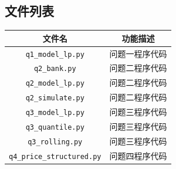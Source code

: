 \begin{appendices}



\section{文件列表}
\begin{table}[H]
  \centering
  \begin{tabular}{cc}
    \toprule
    文件名 & 功能描述 \\
    \midrule
    \texttt{q1\_model\_lp.py}         & 问题一程序代码 \\
    \texttt{q2\_bank.py}              & 问题二程序代码 \\
    \texttt{q2\_model\_lp.py}         & 问题二程序代码 \\
    \texttt{q2\_simulate.py}          & 问题二程序代码 \\
    \texttt{q3\_model\_lp.py}         & 问题三程序代码 \\
    \texttt{q3\_quantile.py}          & 问题三程序代码 \\
    \texttt{q3\_rolling.py}           & 问题三程序代码 \\
    \texttt{q4\_price\_structured.py} & 问题四程序代码 \\
    \bottomrule
  \end{tabular}
\end{table}

\end{appendices}
